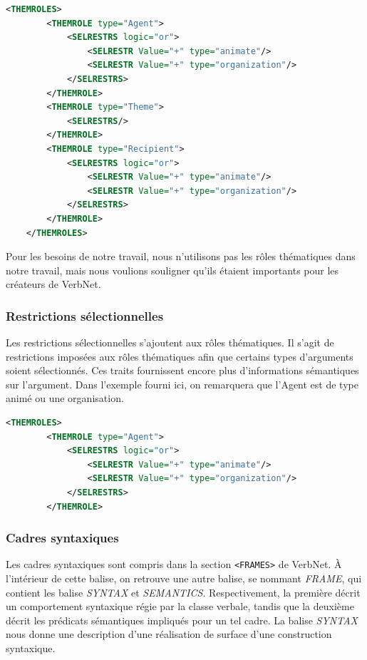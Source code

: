 \begin{lstlisting}[language=XML, caption = Les rôles thématiques] % Majuscule aux captions
    <THEMROLES>
        <THEMROLE type="Agent">
            <SELRESTRS logic="or">
                <SELRESTR Value="+" type="animate"/>
                <SELRESTR Value="+" type="organization"/>
            </SELRESTRS>
        </THEMROLE>
        <THEMROLE type="Theme">
            <SELRESTRS/>
        </THEMROLE>
        <THEMROLE type="Recipient">
            <SELRESTRS logic="or">
                <SELRESTR Value="+" type="animate"/>
                <SELRESTR Value="+" type="organization"/>
            </SELRESTRS>
        </THEMROLE>
    </THEMROLES>
\end{lstlisting}

Pour les besoins de notre travail, nous n'utilisons pas les rôles thématiques dans notre travail, mais nous voulions souligner qu'ils étaient importants pour les créateurs de VerbNet. 

\subsubsection{Restrictions sélectionnelles}

Les restrictions sélectionnelles s'ajoutent aux rôles thématiques. Il s'agit de restrictions imposées aux rôles thématiques afin que certains types d'arguments soient sélectionnés.
Ces traits fournissent encore plus d'informations sémantiques sur l'argument. Dans l'exemple fourni ici, on remarquera que l'Agent est de type animé ou une organisation.

\begin{lstlisting}[language=Xml, caption = Les restrictions sélectionnelles]
    <THEMROLES>
        <THEMROLE type="Agent">
            <SELRESTRS logic="or">
                <SELRESTR Value="+" type="animate"/>
                <SELRESTR Value="+" type="organization"/>
            </SELRESTRS>
        </THEMROLE>
\end{lstlisting}

\subsubsection{Cadres syntaxiques}

Les cadres syntaxiques sont compris dans la section \lstinline{<FRAMES>} de VerbNet. À l'intérieur de cette balise, on retrouve une autre balise, se nommant \emph{FRAME}, qui contient les balise \emph{SYNTAX} et \emph{SEMANTICS}. Respectivement, la première décrit un comportement syntaxique régie par la classe verbale, tandis que la deuxième décrit les prédicats sémantiques impliqués pour un tel cadre. La balise \emph{SYNTAX} nous donne une description d'une réalisation de surface d'une construction syntaxique.

